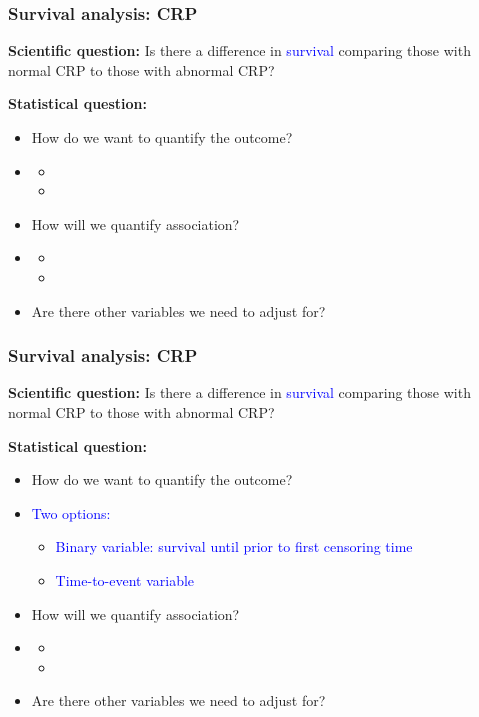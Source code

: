 \documentclass[12pt, 
hyperref={colorlinks=true, linkcolor=blue, urlcolor=cyan},dvipsnames]{beamer}
\begin{document}
\begin{frame}
\frametitle{Survival analysis: CRP}
\textbf{Scientific question:} Is there \textcolor{BurntOrange}{a difference} in \textcolor{blue}{survival} comparing those with normal CRP to those with abnormal CRP?

\textbf{Statistical question:} \vspace{-0.3cm}
\begin{itemize}
\item How do we want to quantify the outcome?
\item[] 
\begin{itemize}
\item[]
\item[]
\end{itemize}
\item How will we quantify association?
\item[] 
\begin{itemize}
\item[]
\item[] 
\end{itemize}
\item Are there other variables we need to adjust for?
\end{itemize}
\end{frame}

\begin{frame}[noframenumbering]
\frametitle{Survival analysis: CRP}
\textbf{Scientific question:} Is there \textcolor{BurntOrange}{a difference} in \textcolor{blue}{survival} comparing those with normal CRP to those with abnormal CRP?

\textbf{Statistical question:} \vspace{-0.3cm}
\begin{itemize}
\item How do we want to quantify the outcome?
\item[] \textcolor{blue}{Two options:}
\begin{itemize}
\item \textcolor{blue}{Binary variable: survival until prior to first censoring time}
\item \textcolor{blue}{Time-to-event variable}
\end{itemize}
\item How will we quantify association?
\item[] 
\begin{itemize}
\item[]
\item[] 
\end{itemize}
\item Are there other variables we need to adjust for?
\end{itemize}
\end{frame}
\end{document}
